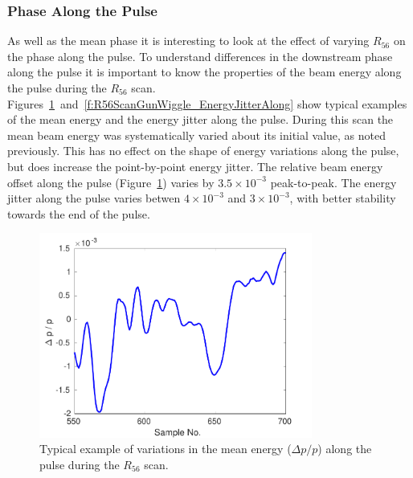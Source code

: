 \subsubsection{Phase Along the Pulse}

As well as the mean phase it is interesting to look at the effect of varying \(R_{56}\) on the phase along the pulse. To understand differences in the downstream phase along the pulse it is important to know the properties of the beam energy along the pulse during the \(R_{56}\) scan. Figures~\ref{f:R56ScanGunWiggle_MeanEnergyAlong}~and~\ref{f:R56ScanGunWiggle_EnergyJitterAlong} show typical examples of the mean energy and the energy jitter along the pulse. During this scan the mean beam energy was systematically varied about its initial value, as noted previously. This has no effect on the shape of energy variations along the pulse, but does increase the point-by-point energy jitter. The relative beam energy offset along the pulse (Figure~\ref{f:R56ScanGunWiggle_MeanEnergyAlong}) varies by \(3.5\times10^{-3}\) peak-to-peak. The energy jitter along the pulse varies betwen \(4\times10^{-3}\) and \(3\times10^{-3}\), with better stability towards the end of the pulse.

\begin{figure}
  \centering
  \includegraphics[width=0.8\textwidth]{Figures/propagation/R56ScanGunWiggle_MeanEnergyAlong}
  \caption{Typical example of variations in the mean energy (\(\Delta p/p\)) along the pulse during the \(R_{56}\) scan.}
  \label{f:R56ScanGunWiggle_MeanEnergyAlong}
\end{figure}

